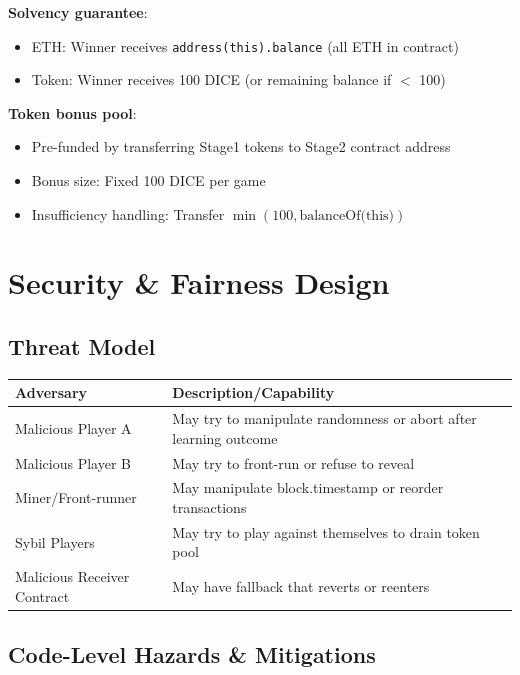 \documentclass[10pt,a4paper]{article}
\begin{document}
\textbf{Solvency guarantee}:
\begin{itemize}
    \item ETH: Winner receives \texttt{address(this).balance} (all ETH in contract)
    \item Token: Winner receives 100 DICE (or remaining balance if $<$ 100)
\end{itemize}

\textbf{Token bonus pool}:
\begin{itemize}
    \item Pre-funded by transferring Stage1 tokens to Stage2 contract address
    \item Bonus size: Fixed 100 DICE per game
    \item Insufficiency handling: Transfer $\min(100, \text{balanceOf(this)})$
\end{itemize}

\section{Security \& Fairness Design}

\subsection*{Threat Model}

\begin{table}[H]
\centering
\begin{tabularx}{\textwidth}{l X}
\toprule
\textbf{Adversary} & \textbf{Description/Capability} \\
\midrule
Malicious Player A & May try to manipulate randomness or abort after learning outcome \\
Malicious Player B & May try to front-run or refuse to reveal \\
Miner/Front-runner & May manipulate block.timestamp or reorder transactions \\
Sybil Players & May try to play against themselves to drain token pool \\
Malicious Receiver Contract & May have fallback that reverts or reenters \\
\bottomrule
\end{tabularx}
\end{table}

\subsection*{Code-Level Hazards \& Mitigations}
\end{document}
